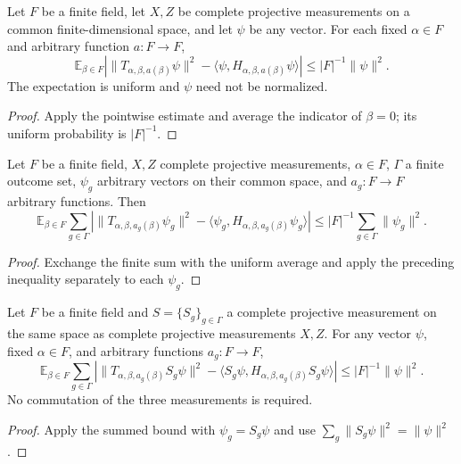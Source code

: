 \begin{theorem}
\label{thm:aux-ordered-exceptional-average}
\leanok
{}
Let $F$ be a finite field, let $X,Z$ be complete projective measurements
on a common finite-dimensional space, and let $\psi$ be any vector. For
each fixed $\alpha\in F$ and arbitrary function $a:F\to F$,
\[
 \mathbb E_{\beta\in F}
 \left|\|T_{\alpha,\beta,a(\beta)}\psi\|^2
 -\langle\psi,H_{\alpha,\beta,a(\beta)}\psi\rangle\right|
 \leq |F|^{-1}\|\psi\|^2.
\]
The expectation is uniform and $\psi$ need not be normalized.
\end{theorem}
\begin{proof}
\leanok
{}
Apply the pointwise estimate and average the indicator of $\beta=0$;
its uniform probability is $|F|^{-1}$.
\end{proof}

\begin{theorem}
\label{thm:aux-ordered-exceptional-sum}
\leanok
{}
Let $F$ be a finite field, $X,Z$ complete projective measurements,
$\alpha\in F$, $\Gamma$ a finite outcome set, $\psi_g$ arbitrary vectors
on their common space, and $a_g:F\to F$ arbitrary functions. Then
\[
 \mathbb E_{\beta\in F}\sum_{g\in\Gamma}
 \left|\|T_{\alpha,\beta,a_g(\beta)}\psi_g\|^2
 -\langle\psi_g,H_{\alpha,\beta,a_g(\beta)}\psi_g\rangle\right|
 \leq |F|^{-1}\sum_{g\in\Gamma}\|\psi_g\|^2.
\]
\end{theorem}
\begin{proof}
\leanok
{}
Exchange the finite sum with the uniform average and apply the preceding
inequality separately to each $\psi_g$.
\end{proof}

\begin{theorem}
\label{thm:aux-projective-exceptional-average}
\leanok
{}
Let $F$ be a finite field and $S=\{S_g\}_{g\in\Gamma}$ a complete projective measurement on
the same space as complete projective measurements $X,Z$. For any vector
$\psi$, fixed $\alpha\in F$, and arbitrary functions $a_g:F\to F$,
\[
 \mathbb E_{\beta\in F}\sum_{g\in\Gamma}
 \left|\|T_{\alpha,\beta,a_g(\beta)}S_g\psi\|^2
 -\langle S_g\psi,H_{\alpha,\beta,a_g(\beta)}S_g\psi\rangle\right|
 \leq |F|^{-1}\|\psi\|^2.
\]
No commutation of the three measurements is required.
\end{theorem}
\begin{proof}
\leanok
{}
Apply the summed bound with $\psi_g=S_g\psi$ and use
$\sum_g\|S_g\psi\|^2=\|\psi\|^2$.
\end{proof}


